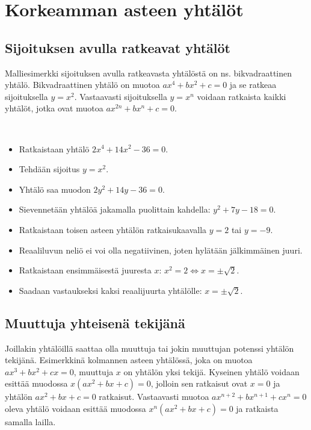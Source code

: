 \chapter{Korkeamman asteen yhtälöt}

\section{Sijoituksen avulla ratkeavat yhtälöt}

Malliesimerkki sijoituksen avulla ratkeavasta yhtälöstä on ns. bikvadraattinen yhtälö.
Bikvadraattinen yhtälö on muotoa $ax^4+bx^2+c=0$ ja se ratkeaa sijoituksella $y=x^2$.
Vastaavasti sijoituksella $y=x^n$ voidaan ratkaista kaikki yhtälöt, jotka ovat muotoa $ax^{2n}+bx^n+c=0$.

\begin{esimerkki}{\ }
\begin{itemize}
    \item Ratkaistaan yhtälö $2x^4+14x^2-36=0$.
    \item Tehdään sijoitus $y=x^2$.
    \item Yhtälö saa muodon $2y^2+14y-36=0$.
    \item Sievennetään yhtälöä jakamalla puolittain kahdella: $y^2+7y-18=0$.
    \item Ratkaistaan toisen asteen yhtälön ratkaisukaavalla $y=2$ tai $y=-9$.
    \item Reaaliluvun neliö ei voi olla negatiivinen, joten hylätään jälkimmäinen juuri.
    \item Ratkaistaan ensimmäisestä juuresta $x$: $x^2=2 \Leftrightarrow  x=\pm\sqrt{2}$.
    \item Saadaan vastaukseksi kaksi reaalijuurta yhtälölle: $x=\pm\sqrt{2}$.
\end{itemize}
\end{esimerkki}

\section{Muuttuja yhteisenä tekijänä}

Joillakin yhtälöillä saattaa olla muuttuja tai jokin muuttujan potenssi yhtälön tekijänä. Esimerkkinä kolmannen asteen yhtälössä, joka on muotoa $ax^3+bx^2+cx=0$, muuttuja $x$ on yhtälön yksi tekijä. Kyseinen yhtälö voidaan esittää muodossa $x(ax^2+bx+c)=0$, jolloin sen ratkaisut ovat $x=0$ ja yhtälön $ax^2+bx+c=0$ ratkaisut. Vastaavasti muotoa $ax^{n+2}+bx^{n+1}+cx^n=0$ oleva yhtälö voidaan esittää muodossa $x^n(ax^2+bx+c)=0$ ja ratkaista samalla lailla.


